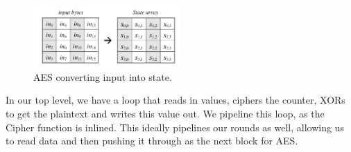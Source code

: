 \begin{figure}[h]
\centering
\includegraphics[width=0.5\textwidth]{aesstate}
\caption{AES converting input into state.}
\label{fig:aesstate}
\end{figure}

In our top level, we have a loop that reads in values, ciphers the counter, XORs to get the plaintext and writes this value out. We pipeline this loop, as the Cipher function is inlined. This ideally pipelines our rounds as well, allowing us to read data and then pushing it through as the next block for AES.  

